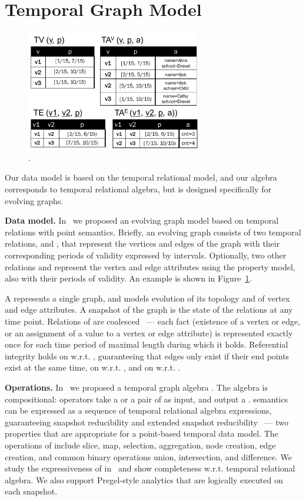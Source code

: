 \section{Temporal Graph Model}
\label{sec:tga}

\begin{figure}[t]
\centering
\includegraphics[width=3in]{figs/T1_rel.pdf}
\caption{\tg {}.}
\label{fig:tg_rel}
\end{figure}

Our data model is based on the temporal relational model, and our
algebra corresponds to temporal relational algebra, but is designed
specifically for evolving graphs.  

{\bf Data model.}  In~\cite{PortalarXiv2016} we proposed an evolving
graph model \tg based on temporal relations with point semantics.
Briefly, an evolving graph consists of two temporal relations,
 and , that represent the vertices and edges of the
graph with their corresponding periods of validity expressed by
intervals.  Optionally, two other relations  and 
represent the vertex and edge attributes using the property model,
also with their periods of validity.  An example is shown in
Figure~\ref{fig:tg_rel}.

A \tg represents a single graph, and models evolution of its topology
and of vertex and edge attributes.  A snapshot of the graph is the
state of the relations at any time point.  Relations of \tg are
coalesced~\cite{DBLP:conf/vldb/BohlenSS96} --- each fact (existence of
a vertex or edge, or an assignment of a value to a vertex or edge
attribute) is represented exactly once for each time period of maximal
length during which it holds.  Referential integrity holds on
 w.r.t. , guaranteeing that edges only exist if
their end points exist at the same time, on 
w.r.t. , and on  w.r.t. .

{\bf Operations.} In~\cite{PortalarXiv2016} we proposed a temporal
graph algebra \tga.  The algebra is compositional: operators take a
\tg or a pair of \tgs as input, and output a \tg.  \tga semantics can
be expressed as a sequence of temporal relational algebra expressions,
guaranteeing snapshot reducibility and extended snapshot
reducibility~\cite{DBLP:reference/db/Bohlen092} --- two properties
that are appropriate for a point-based temporal data model.  The
operations of \tga include slice, map, selection, aggregation, node
creation, edge creation, and common binary operations union,
intersection, and difference.  We study the expressiveness of \tga
in~\cite{PortalarXiv2016} and show completeness w.r.t. temporal
relational algebra.  We also support Pregel-style analytics that are
logically executed on each snapshot.

